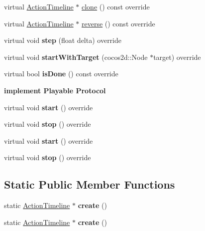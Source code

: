 \begin{DoxyCompactItemize}
virtual \hyperlink{classActionTimeline}{Action\+Timeline} $\ast$ \hyperlink{classActionTimeline_a38315f4351ad806d36f607acc70a3e7a}{clone} () const override
\item 
virtual \hyperlink{classActionTimeline}{Action\+Timeline} $\ast$ \hyperlink{classActionTimeline_ad242317b6d9108b0840cf535ea760786}{reverse} () const override
\item 
\mbox{\label{classActionTimeline_ac1c635151f6dac85ab9c5817dce20ce7}} 
virtual void {\bfseries step} (float delta) override
\item 
\mbox{\label{classActionTimeline_aba948c1a814f54f5fde9fcc877b99d0e}} 
virtual void {\bfseries start\+With\+Target} (cocos2d\+::\+Node $\ast$target) override
\item 
\mbox{\label{classActionTimeline_a60cfc77726fa9a506daba6fa87cd7729}} 
virtual bool {\bfseries is\+Done} () const override
\end{DoxyCompactItemize}
\begin{Indent}\textbf{ implement Playable Protocol}\par
\begin{DoxyCompactItemize}
\item 
\mbox{\label{classActionTimeline_a3675e7596552da143c3085f0ea8023b9}} 
virtual void {\bfseries start} () override
\item 
\mbox{\label{classActionTimeline_a83d5e1c3a4237710b2202665239f4eee}} 
virtual void {\bfseries stop} () override
\item 
\mbox{\label{classActionTimeline_a35ae245d9acdfe17a64cfa8782d3b4b9}} 
virtual void {\bfseries start} () override
\item 
\mbox{\label{classActionTimeline_ab2f6a189d57433b5f9fbc7f7466a69c6}} 
virtual void {\bfseries stop} () override
\end{DoxyCompactItemize}
\end{Indent}
\subsection*{Static Public Member Functions}
\begin{DoxyCompactItemize}
\item 
\mbox{\label{classActionTimeline_aee4e55469aca0e27ff2abcfbda883197}} 
static \hyperlink{classActionTimeline}{Action\+Timeline} $\ast$ {\bfseries create} ()
\item 
\mbox{\label{classActionTimeline_ac858ad0ff6db5fbd5dc8d5a692f19ecf}} 
static \hyperlink{classActionTimeline}{Action\+Timeline} $\ast$ {\bfseries create} ()
\end{DoxyCompactItemize}
